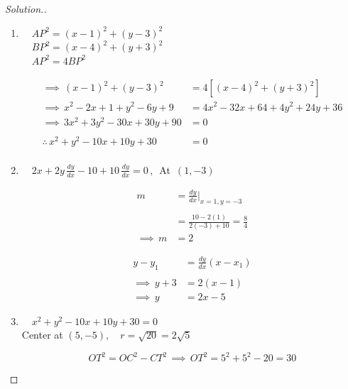 \documentclass[11pt,a4paper]{article}
\theoremstyle{definition}
\newenvironment{solution}
  {\renewcommand{\qedsymbol}{}\begin{proof}[\textit{Solution}.]}
  {\end{proof}}
\begin{document}
\begin{solution}

\begin{enumerate}
\item[a.] $\quad  AP^2 = (x - 1)^2 + (y - 3)^2$\\

$\quad  BP^2 = (x- 4)^2 + (y + 3)^2$\\

$\quad  AP^2 = 4BP^2$

\begin{align*}
\implies\, (x - 1)^2 + (y - 3)^2 & = 4\left[ (x - 4)^2 + (y + 3)^2\right]\\
\implies \, x^2 - 2x + 1 + y^2 - 6y + 9 & = 4x^2 - 32x + 64 + 4y^2 + 24y + 36\\
\implies \, 3x^2 + 3y^2 - 30x + 30y + 90 & = 0\\\\
\therefore \,  x^2 + y^2 - 10x + 10y + 30 & = 0\\
\end{align*}



\item[b.] $\quad \displaystyle{2x + 2y\,\frac{dy}{dx} - 10 + 10\,\frac{dy}{dx} = 0\,,\,}$ At $\,(1,-3)$

\begin{align*}
m & = \frac{dy}{dx}\Bigg|_{x = 1, y = -3}\\\\
 & = \frac{10 - 2(1)}{2(-3) + 10}
 = \frac{8}{4}\\
\implies \, m & = 2
\end{align*}


\begin{align*}
y - y_1 & = \frac{dy}{dx}(x - x_1)\\\\
\implies \, y + 3 & = 2(x- 1)\\
\implies \, y &  = 2x - 5
\end{align*}



\item[c.] $\quad  x^2 + y^2 - 10x + 10y + 30 = 0$\\

Center at $(5,-5),\quad  r = \sqrt{20} = 2\sqrt{5}$

\begin{figure}[H]
\centering
{}
\end{figure}


$$OT^2 = OC^2 - CT^2 \,\implies \, OT^2 = 5^2 + 5^2 - 20 = 30$$
\end{enumerate}
\end{solution}
\end{document}
